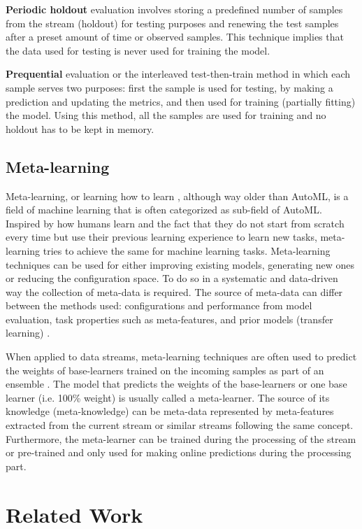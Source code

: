 \documentclass{sig-alternate-br}
\begin{document}
\textbf{Periodic holdout} evaluation involves storing a predefined number of samples from the stream (holdout) for testing purposes and renewing the test samples after a preset amount of time or observed samples. This technique implies that the data used for testing is never used for training the model.

\textbf{Prequential} evaluation or the interleaved test-then-train method in which each sample serves two purposes: first the sample is used for testing, by making a prediction and updating the metrics, and then used for training (partially fitting) the model. Using this method, all the samples are used for training and no holdout has to be kept in memory.

\subsection{Meta-learning}

Meta-learning, or learning how to learn \cite{vanschoren2018meta}, although way older than AutoML, is a field of machine learning that is often categorized as sub-field of AutoML. Inspired by how humans learn and the fact that they do not start from scratch every time but use their previous learning experience to learn new tasks, meta-learning tries to achieve the same for machine learning tasks. Meta-learning techniques can be used for either improving existing models, generating new ones or reducing the configuration space. To do so in a systematic and data-driven way the collection of meta-data is required. The source of meta-data can differ between the methods used: configurations and performance from model evaluation, task properties such as meta-features, and prior models (transfer learning) \cite{vanschoren2014openml}.

When applied to data streams, meta-learning techniques are often used to predict the weights of base-learners trained on the incoming samples as part of an ensemble \cite{van2018online}. The model that predicts the weights of the base-learners or one base learner (i.e. 100\% weight) is usually called a meta-learner. The source of its knowledge (meta-knowledge) can be meta-data represented by meta-features \cite{rossi2017guidance} extracted from the current stream or similar streams following the same concept. Furthermore, the meta-learner can be trained during the processing of the stream or pre-trained and only used for making online predictions during the processing part.

\section{Related Work}
\label{relatedwork}
\end{document}
